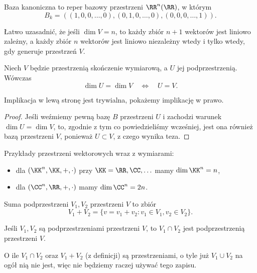 \begin{definition}
    Baza kanoniczna to reper bazowy przestrzeni $\RR^n(\RR)$, w którym
    \[ B_k = \left((1,0,0,\ldots,0), (0,1,0,\ldots,0), (0,0,0,\ldots,1)\right). \]
\end{definition}

Łatwo uzasadnić, że jeśli $\dim V = n$, to każdy zbiór $n + 1$ wektorów jest liniowo zależny, a każdy zbiór $n$ wektorów jest liniowo niezależny wtedy i tylko wtedy, gdy generuje przestrzeń $V$.

\begin{theorem}
    \label{t:dimU = dimV, U subspace V}
    Niech $V$ będzie przestrzenią skończenie wymiarową, a $U$ jej podprzestrzenią. Wówczas
    \[ \dim U = \dim V \quad\iff\quad U = V. \]
\end{theorem}
Implikacja w lewą stronę jest trywialna, pokażemy implikację w prawo.
\begin{proof}
    Jeśli weźmiemy pewną bazę $B$ przestrzeni $U$ i zachodzi warunek $\dim U = \dim V$, to, zgodnie z tym co powiedzieliśmy wcześniej, jest ona również bazą przestrzeni $V$, ponieważ $U \subset V$, z czego wynika teza.
\end{proof}

\begin{example}
    Przykłady przestrzeni wektorowych wraz z wymiarami:
    \begin{itemize}
        \item dla $(\KK^n, \KK, +, \cdot)$ przy $\KK = \RR, \CC, \ldots$ mamy $\dim \KK^n = n$,
        \item dla $(\CC^n, \RR, +, \cdot)$ mamy $\dim \CC^n = 2n$.
    \end{itemize}
\end{example}

\begin{definition}
    \label{d:sum of spaces}
    Suma podprzestrzeni $V_1, V_2$ przestrzeni $V$ to zbiór
    \[ V_1 + V_2 = \{v = v_1 + v_2 : v_1 \in V_1, v_2 \in V_2\}. \]
\end{definition}

\begin{fact}
    Jeśli $V_1, V_2$ są podprzestrzeniami przestrzeni $V$, to $V_1 \cap V_2$ jest podprzestrzenią przestrzeni $V$.
\end{fact}

\begin{remark}
    O ile $V_1 \cap V_2$ oraz $V_1 + V_2$ (z definicji) są przestrzeniami, o tyle już $V_1 \cup V_2$ na ogół nią nie jest, więc nie będziemy raczej używać tego zapisu.
\end{remark}

